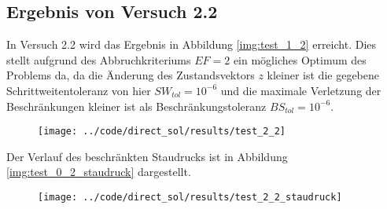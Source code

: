 \subsection{Ergebnis von Versuch 2.2}\label{kap:Versuch22}
In Versuch 2.2 wird das Ergebnis in Abbildung \ref{img:test_1_2} erreicht. Dies stellt aufgrund des Abbruchkriteriums $EF = 2$ ein mögliches Optimum des Problems da, da die Änderung des Zustandsvektors $z$ kleiner ist die gegebene Schrittweitentoleranz von hier $SW_{tol} = 10^{-6}$ und die maximale Verletzung der Beschränkungen kleiner ist als Beschränkungstoleranz $BS_{tol} = 10^{-6}$.
\begin{figure}[H]
\begin{center}
\texttt{[image: ../code/direct\_sol/results/test\_2\_2]}
 \label{img:test_2_2}
\end{center}
\end{figure}
Der Verlauf des beschränkten Staudrucks ist in Abbildung \ref{img:test_0_2_staudruck} dargestellt.
\begin{figure}[H]
\begin{center}
\texttt{[image: ../code/direct\_sol/results/test\_2\_2\_staudruck]}
 \label{img:test_2_2_staudruck}
\end{center}
\end{figure}














\newpage
